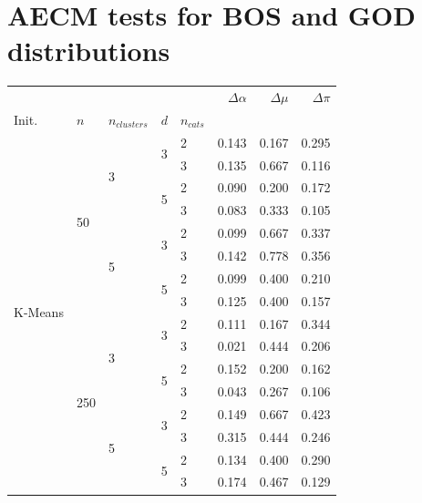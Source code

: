 
\section{AECM tests for BOS and GOD distributions}
\label{appendix:metrics_synth}

\begin{table}[H]
\centering
\begin{minipage}{.48\columnwidth}
\centering
\begin{adjustbox}{width=\columnwidth}
\begin{tabular}{lllllrrr}
\toprule
 &  &  &  &  & $\Delta \alpha$ & $\Delta \mu$ & $\Delta \pi$ \\
Init. & $n$ & $n_{clusters}$ & $d$ & $n_{cats}$ &  &  &  \\
\midrule
\multirow[t]{16}{*}{K-Means} & \multirow[t]{8}{*}{50} & \multirow[t]{4}{*}{3} & \multirow[t]{2}{*}{3} & 2 & 0.143 & 0.167 & 0.295 \\
 &  &  &  & 3 & 0.135 & 0.667 & 0.116 \\
\cline{4-8}
 &  &  & \multirow[t]{2}{*}{5} & 2 & 0.090 & 0.200 & 0.172 \\
 &  &  &  & 3 & 0.083 & 0.333 & 0.105 \\
\cline{3-8} \cline{4-8}
 &  & \multirow[t]{4}{*}{5} & \multirow[t]{2}{*}{3} & 2 & 0.099 & 0.667 & 0.337 \\
 &  &  &  & 3 & 0.142 & 0.778 & 0.356 \\
\cline{4-8}
 &  &  & \multirow[t]{2}{*}{5} & 2 & 0.099 & 0.400 & 0.210 \\
 &  &  &  & 3 & 0.125 & 0.400 & 0.157 \\
\cline{2-8} \cline{3-8} \cline{4-8}
 & \multirow[t]{8}{*}{250} & \multirow[t]{4}{*}{3} & \multirow[t]{2}{*}{3} & 2 & 0.111 & 0.167 & 0.344 \\
 &  &  &  & 3 & 0.021 & 0.444 & 0.206 \\
\cline{4-8}
 &  &  & \multirow[t]{2}{*}{5} & 2 & 0.152 & 0.200 & 0.162 \\
 &  &  &  & 3 & 0.043 & 0.267 & 0.106 \\
\cline{3-8} \cline{4-8}
 &  & \multirow[t]{4}{*}{5} & \multirow[t]{2}{*}{3} & 2 & 0.149 & 0.667 & 0.423 \\
 &  &  &  & 3 & 0.315 & 0.444 & 0.246 \\
\cline{4-8}
 &  &  & \multirow[t]{2}{*}{5} & 2 & 0.134 & 0.400 & 0.290 \\
 &  &  &  & 3 & 0.174 & 0.467 & 0.129 \\
\cline{1-8} \cline{2-8} \cline{3-8} \cline{4-8}

\end{tabular}
\end{adjustbox}
\end{minipage}
\end{table}
